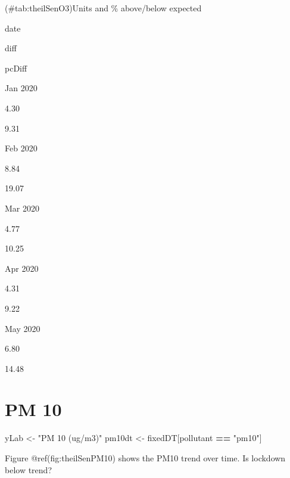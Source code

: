 \documentclass[]{article}
\newenvironment{Shaded}{\begin{snugshade}}{\end{snugshade}}
\newcommand{\KeywordTok}[1]{\textcolor[rgb]{0.13,0.29,0.53}{\textbf{#1}}}
\newcommand{\DataTypeTok}[1]{\textcolor[rgb]{0.13,0.29,0.53}{#1}}
\newcommand{\DecValTok}[1]{\textcolor[rgb]{0.00,0.00,0.81}{#1}}
\newcommand{\StringTok}[1]{\textcolor[rgb]{0.31,0.60,0.02}{#1}}
\newcommand{\CommentTok}[1]{\textcolor[rgb]{0.56,0.35,0.01}{\textit{#1}}}
\newcommand{\OtherTok}[1]{\textcolor[rgb]{0.56,0.35,0.01}{#1}}
\newcommand{\OperatorTok}[1]{\textcolor[rgb]{0.81,0.36,0.00}{\textbf{#1}}}
\newcommand{\NormalTok}[1]{#1}
\begin{document}
(\#tab:theilSenO3)Units and \% above/below expected

date

diff

pcDiff

Jan 2020

4.30

9.31

Feb 2020

8.84

19.07

Mar 2020

4.77

10.25

Apr 2020

4.31

9.22

May 2020

6.80

14.48

\section{PM 10}\label{pm-10}

\begin{Shaded}
\begin{Highlighting}[]
\NormalTok{yLab <-}\StringTok{ "PM 10 (ug/m3)"}
\NormalTok{pm10dt <-}\StringTok{ }\NormalTok{fixedDT[pollutant }\OperatorTok{==}\StringTok{ "pm10"}\NormalTok{]}
\end{Highlighting}
\end{Shaded}

Figure @ref(fig:theilSenPM10) shows the PM10 trend over time. Is
lockdown below trend?

\begin{Shaded}
\end{Shaded}
\end{document}
